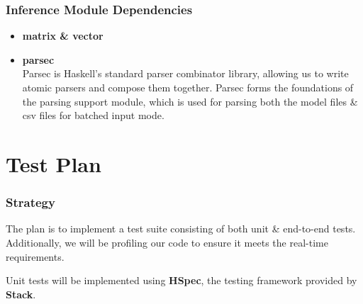 \documentclass{beamer}
\begin{document}
\begin{frame}
  \frametitle{Inference Module Dependencies}

  \begin{itemize}
    \item \textbf{matrix \& vector}\\


    \item<4-> \textbf{parsec}\\
    Parsec is Haskell's standard parser combinator library, allowing us to write atomic parsers and compose them together. Parsec forms the foundations of the parsing support module, which is used for parsing both the model files \& csv files for batched input mode.\bigskip

  \end{itemize}

\end{frame}

\section{Test Plan}

\begin{frame}
  \frametitle{Strategy}
  
  The plan is to implement a test suite consisting of both unit \& end-to-end tests. Additionally, we will be profiling our code to ensure it meets the real-time requirements.\bigskip

  Unit tests will be implemented using \textbf{HSpec}, the testing framework provided by \textbf{Stack}.
\end{frame}
\end{document}
